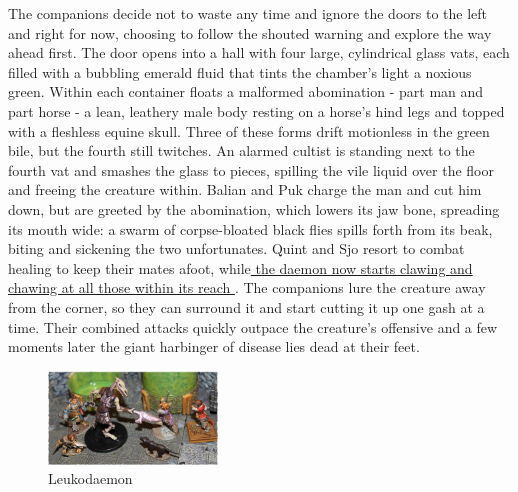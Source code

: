 The companions decide not to waste any time and ignore the doors to the left and right for now, choosing to follow the shouted warning and explore the way ahead first. The door opens into a hall with four large, cylindrical glass vats, each filled with a bubbling emerald fluid that tints the chamber's light a noxious green. Within each container floats a malformed abomination - part man and part horse - a lean, leathery male body resting on a horse's hind legs and topped with a fleshless equine skull. Three of these forms drift motionless in the green bile, but the fourth still twitches. An alarmed cultist is standing next to the fourth vat and smashes the glass to pieces, spilling the vile liquid over the floor and freeing the creature within. Balian and Puk charge the man and cut him down, but are greeted by the abomination, which lowers its jaw bone, spreading its mouth wide: a swarm of corpse-bloated black flies spills forth from its beak, biting and sickening the two unfortunates. Quint and Sjo resort to combat healing to keep their mates afoot, while\hyperref[fig:Leukodaemon-523050841]{ the daemon now starts clawing and chawing at all those within its reach } . The companions lure the creature away from the corner, so they can surround it and start cutting it up one gash at a time. Their combined attacks quickly outpace the creature's offensive and a few moments later the giant harbinger of disease lies dead at their feet. \\

\begin{figure}[h]
	\centering
	\includegraphics[width=0.4\textwidth]{images/Leukodaemon-523050841_mod.jpg}
	\caption{Leukodaemon}
	\label{fig:Leukodaemon-523050841}
\end{figure}

